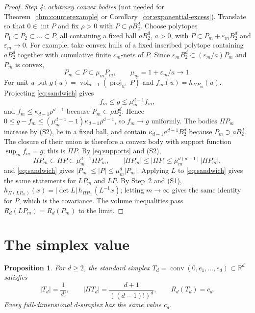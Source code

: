 \documentclass[11pt]{article}
\newtheorem{proposition}[theorem]{Proposition}
\newcommand{\R}{\mathbb R}
\DeclareMathOperator{\conv}{conv}
\DeclareMathOperator{\vol}{vol}
\DeclareMathOperator{\proj}{proj}
\begin{document}
\begin{proof}
\emph{Step 4: arbitrary convex bodies} (not needed for Theorem~\ref{thm:counterexample} or Corollary~\ref{cor:exponential-excess}). Translate so that \(0\in\operatorname{int}P\) and fix \(\rho>0\) with \(P\subset\rho B_2^d\). Choose polytopes \(P_1\subset P_2\subset\dots\subset P\), all containing a fixed ball \(aB_2^d\), \(a>0\), with \(P\subset P_m+\varepsilon_mB_2^d\) and \(\varepsilon_m\to0\). For example, take convex hulls of a fixed inscribed polytope containing \(aB_2^d\) together with cumulative finite \(\varepsilon_m\)-nets of \(P\). Since \(\varepsilon_mB_2^d\subset(\varepsilon_m/a)P_m\) and \(P_m\) is convex,
\begin{equation}\label{eq:sandwich}
 P_m\subset P\subset\mu_mP_m,\qquad\mu_m=1+\varepsilon_m/a\longrightarrow1.
\end{equation}
For unit \(u\) put \(g(u)=\vol_{d-1}(\proj_{u^\perp}P)\) and \(f_m(u)=h_{\Pi P_m}(u)\). Projecting \eqref{eq:sandwich} gives
\begin{equation}\label{eq:supports}
 f_m\le g\le\mu_m^{d-1}f_m,
\end{equation}
and \(f_m\le\kappa_{d-1}\rho^{d-1}\) because \(P_m\subset\rho B_2^d\). Hence \(0\le g-f_m\le(\mu_m^{d-1}-1)\kappa_{d-1}\rho^{d-1}\), so \(f_m\to g\) uniformly. The bodies \(\Pi P_m\) increase by (S2), lie in a fixed ball, and contain \(\kappa_{d-1}a^{d-1}B_2^d\) because \(P_m\supset aB_2^d\). The closure of their union is therefore a convex body with support function \(\sup_mf_m=g\); this is \(\Pi P\). By \eqref{eq:supports} and (S2),
\[
 \Pi P_m\subset\Pi P\subset\mu_m^{d-1}\Pi P_m,
 \qquad
 |\Pi P_m|\le|\Pi P|\le\mu_m^{d(d-1)}|\Pi P_m|,
\]
and \eqref{eq:sandwich} gives \(|P_m|\le|P|\le\mu_m^d|P_m|\). Applying \(L\) to \eqref{eq:sandwich} gives the same statements for \(LP_m\) and \(LP\). By Step~2 and (S1), \(h_{\Pi(LP_m)}(x)=|\det L|\,h_{\Pi P_m}(L^{-1}x)\); letting \(m\to\infty\) gives the same identity for \(P\), which is the covariance. The volume inequalities pass \(R_d(LP_m)=R_d(P_m)\) to the limit.
\end{proof}

\section{The simplex value}\label{sec:simplex}

\begin{proposition}\label{prop:simplex}
For \(d\ge2\), the standard simplex
\(T_d=\conv(0,e_1,\ldots,e_d)\subset\R^d\) satisfies
\[
 |T_d|=\frac1{d!},\qquad
 |\Pi T_d|=\frac{d+1}{((d-1)!)^d},\qquad
 R_d(T_d)=c_d.
\]
Every full-dimensional \(d\)-simplex has the same value \(c_d\).
\end{proposition}
\end{document}
